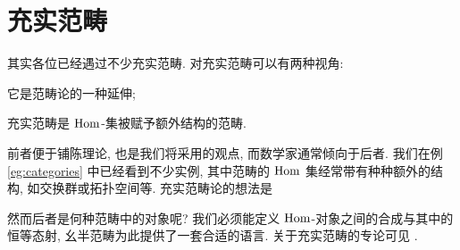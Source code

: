 \section{充实范畴}\label{sec:enriched-cat}
其实各位已经遇过不少充实范畴. 对充实范畴可以有两种视角:
\begin{compactitem}
	\item 它是范畴论的一种延伸;
	\item 充实范畴是 $\operatorname{Hom}$-集被赋予额外结构的范畴.
\end{compactitem}
前者便于铺陈理论, 也是我们将采用的观点, 而数学家通常倾向于后者. 我们在例 \ref{eg:categories} 中已经看到不少实例, 其中范畴的 $\operatorname{Hom}$ 集经常带有种种额外的结构, 如交换群或拓扑空间等. 充实范畴论的想法是
\begin{center}\end{center}
然而后者是何种范畴中的对象呢? 我们必须能定义 $\operatorname{Hom}$-对象之间的合成与其中的恒等态射, 幺半范畴为此提供了一套合适的语言. 关于充实范畴的专论可见 \cite{Ke05}.

